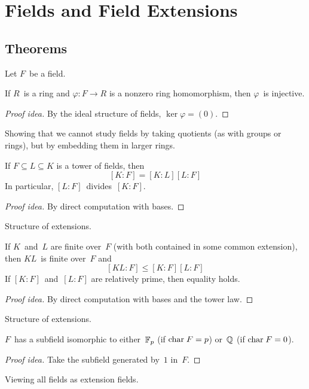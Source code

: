 %
%
%
\section{Fields and Field Extensions}
\subsection*{Theorems}
Let \(F\)~be a field.
\begin{thm}
If \(R\)~is a ring and \(\varphi:F\to R\) is a nonzero ring homomorphism, then \(\varphi\)~is injective.
\end{thm}
\begin{proof}[Proof idea]
By the ideal structure of fields, \(\ker\varphi=(0)\).
\end{proof}
\begin{app}
Showing that we cannot study fields by taking quotients (as with groups or rings), but by embedding them in larger rings.
\end{app}

\begin{thm}
If \(F\subseteq L\subseteq K\) is a tower of fields, then
\[[K:F]=[K:L][L:F]\]
In particular, \([L:F]\)~divides~\([K:F]\).
\end{thm}
\begin{proof}[Proof idea]
By direct computation with bases.
\end{proof}
\begin{app}
Structure of extensions.
\end{app}

\begin{thm}
If \(K\)~and~\(L\) are finite over~\(F\) (with both contained in some common extension), then \(KL\)~is finite over~\(F\) and
\[[KL:F]\le[K:F][L:F]\]
If \([K:F]\)~and~\([L:F]\) are relatively prime, then equality holds.
\end{thm}
\begin{proof}[Proof idea]
By direct computation with bases and the tower law.
\end{proof}
\begin{app}
Structure of extensions.
\end{app}

\begin{thm}
\(F\)~has a subfield isomorphic to either~\(\mathbb{F}_p\) (if \(\mathrel{\mathrm{char}} F=p\)) or~\(\mathbb{Q}\) (if \(\mathrel{\mathrm{char}} F=0\)).
\end{thm}
\begin{proof}[Proof idea]
Take the subfield generated by~\(1\) in~\(F\).
\end{proof}
\begin{app}
Viewing all fields as extension fields.
\end{app}

